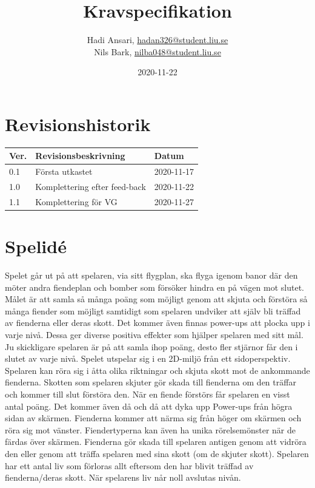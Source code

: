 \documentclass{TDP005mall}
\author{Hadi Ansari, \url{hadan326@student.liu.se}\\
  Nils Bark, \url{nilba048@student.liu.se}}
\title{Kravspecifikation}
\date{2020-11-22}
\begin{document}
\projectpage
\tableofcontents
\thispagestyle{empty}
\cleardoublepage

\section{Revisionshistorik}
\begin{table}[!h]
\begin{tabularx}{\linewidth}{|l|X|l|}
\hline
Ver. & Revisionsbeskrivning & Datum \\\hline
0.1 & Första utkastet & 2020-11-17 \\\hline
1.0 & Komplettering efter feed-back & 2020-11-22 \\\hline
1.1 & Komplettering för VG & 2020-11-27 \\\hline

\end{tabularx}
\end{table}


\section{Spelidé}
Spelet går ut på att spelaren, via sitt flygplan, ska flyga igenom banor där den möter andra fiendeplan och bomber som försöker hindra en på vägen mot slutet. 
Målet är att samla så många poäng som möjligt genom att skjuta och förstöra så många fiender som möjligt samtidigt som spelaren undviker att själv bli träffad av fienderna eller deras skott.
Det kommer även finnas power-ups att plocka upp i varje nivå. Dessa ger diverse positiva effekter som hjälper spelaren med sitt mål. 
Ju skickligare spelaren är på att samla ihop poäng, desto fler stjärnor får den i slutet av varje nivå.
Spelet utspelar sig i en 2D-miljö från ett sidoperspektiv. Spelaren kan röra sig i åtta olika
riktningar och skjuta skott mot de ankommande fienderna. Skotten som spelaren skjuter gör
skada till fienderna om den träffar och kommer till slut förstöra den. När en fiende förstörs
får spelaren en visst antal poäng. Det kommer även då och då att dyka upp Power-ups från högra sidan av skärmen. 
Fienderna kommer att närma sig från höger om skärmen och röra sig mot vänster. 
Fiendertyperna kan även ha unika rörelsemönster när de färdas över skärmen. 
Fienderna gör skada till spelaren antigen genom att vidröra den
eller genom att träffa spelaren med sina skott (om de skjuter skott). 
Spelaren har ett antal liv som förloras allt eftersom den har blivit träffad av fienderna/deras skott.
När spelarens liv når noll avslutas nivån.
\end{document}

